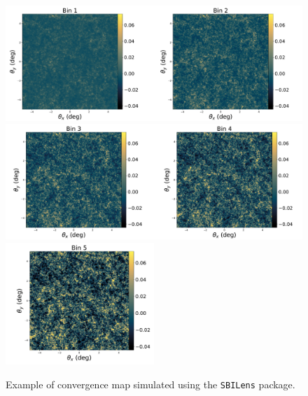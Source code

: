 \documentclass{aa}
\begin{document}
\begin{figure}
    \begin{center}
    \includegraphics[width=\textwidth]{figures/bin1and2.pdf}
    \includegraphics[width=\textwidth]{figures/bin3.pdf}
    \includegraphics[width=0.5\textwidth]{figures/bin5.pdf}
    \caption{
     Example of convergence map simulated using the \texttt{SBILens} package.
    }
     \label{fig:convergence_maps}
     \end{center}
\end{figure}
\end{document}

